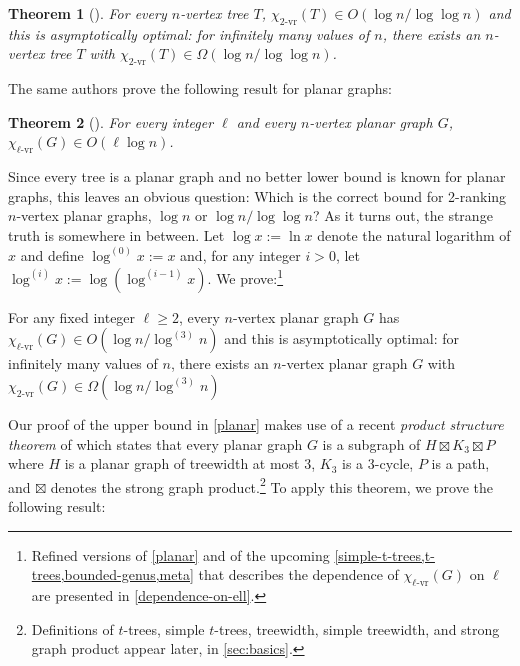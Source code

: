 \documentclass[kpfonts]{patmorin}
\newcommand{\rn}[1]{\chi_{\operatorname{#1-vr}}}
\newcommand{\trn}{\rn{2}}
\newcommand{\lrn}{\rn{\ell}}
\newtheorem{othertheorem}{Theorem}
\theoremstyle{named}
\begin{document}
\setcounter{othertheorem}{19}
\begin{othertheorem}[\cite{karpas.neiman.ea:on}]\label{trees}
    For every $n$-vertex tree $T$, $\trn(T)\in O(\log n/\log\log n)$ and this is asymptotically optimal: for infinitely many values of $n$, there exists an $n$-vertex tree $T$ with $\trn(T)\in\Omega(\log n/\log\log n)$.
\end{othertheorem}

The same authors prove the following result for planar graphs:

\setcounter{othertheorem}{15}
\begin{othertheorem}[\cite{karpas.neiman.ea:on}]\label{planar-graphs}
    For every integer $\ell$ and every $n$-vertex planar graph $G$, $\lrn(G)\in O(\ell\log n)$.
\end{othertheorem}

Since every tree is a planar graph and no better lower bound is known for planar graphs, this leaves an obvious question:  Which is the correct bound for 2-ranking $n$-vertex planar graphs, $\log n$ or $\log n/\log\log n$?  As it turns out, the strange truth is somewhere in between.  Let $\log x :=\ln x$ denote the natural logarithm of $x$ and define $\log^{(0)}x:=x$ and, for any integer $i>0$, let $\log^{(i)}x:=\log(\log^{(i-1)} x)$. We prove:\footnote{Refined versions of \cref{planar} and of the upcoming \cref{simple-t-trees,t-trees,bounded-genus,meta} that describes the dependence of $\lrn(G)$ on $\ell$ are presented in \cref{dependence-on-ell}.}


\begin{thm}\label{planar}
    For any fixed integer $\ell\ge 2$, every $n$-vertex planar graph $G$ has $\lrn(G)\in O(\log n/\log^{(3)} n)$ and this is asymptotically optimal: for infinitely many values of $n$, there exists an $n$-vertex planar graph $G$ with $\trn(G)\in \Omega(\log n/\log^{(3)} n)$
\end{thm}


Our proof of the upper bound in \cref{planar} makes use of a recent \emph{product structure theorem} of \citet{dujmovic.joret.ea:planar} which states that every planar graph $G$ is a subgraph of $H\boxtimes K_3\boxtimes P$ where $H$ is a planar graph of treewidth at most $3$, $K_3$ is a 3-cycle, $P$ is a path, and $\boxtimes$ denotes the strong graph product.\footnote{Definitions of $t$-trees, simple $t$-trees, treewidth, simple treewidth, and strong graph product appear later, in \cref{sec:basics}.}  To apply this theorem, we prove the following result:
\end{document}
